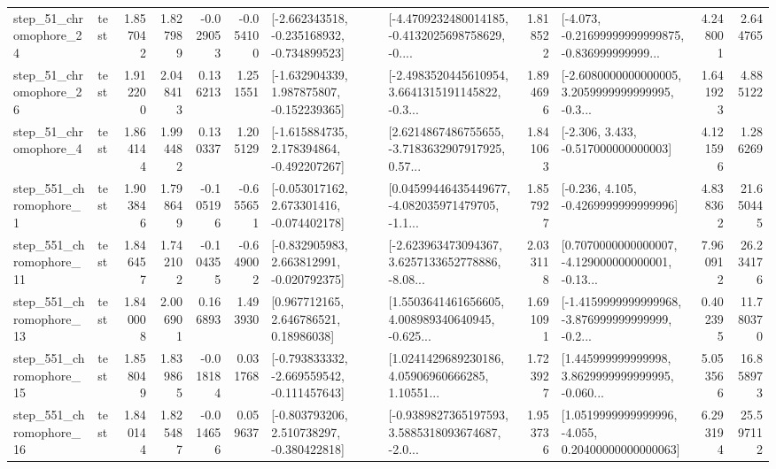 \begin{tabular}{llrrrrllrlrr}
   step\_51\_chromophore\_24 &      test &      1.857042 &    1.827989 &     -0.029053 & -0.054100 &  [-2.662343518, -0.235168932, -0.734899523] &  [-4.4709232480014185, -0.4132025698758629, -0.... &       1.818522 &  [-4.073, -0.21699999999999875, -0.836999999999... &            4.248001 &          2.644765 \\
   step\_51\_chromophore\_26 &      test &      1.912200 &    2.048413 &      0.136213 &  1.251551 &   [-1.632904339, 1.987875807, -0.152239365] &  [-2.4983520445610954, 3.6641315191145822, -0.3... &       1.894696 &  [-2.6080000000000005, 3.2059999999999995, -0.3... &            1.641923 &          4.885122 \\
    step\_51\_chromophore\_4 &      test &      1.864144 &    1.994482 &      0.130337 &  1.205129 &   [-1.615884735, 2.178394864, -0.492207267] &  [2.6214867486755655, -3.7183632907917925, 0.57... &       1.841063 &                [-2.306, 3.433, -0.517000000000003] &            4.121596 &          1.286269 \\
   step\_551\_chromophore\_1 &      test &      1.903846 &    1.798649 &     -0.105196 & -0.655651 &   [-0.053017162, 2.673301416, -0.074402178] &  [0.04599446435449677, -4.082035971479705, -1.1... &       1.857927 &               [-0.236, 4.105, -0.4269999999999996] &            4.838362 &         21.650445 \\
  step\_551\_chromophore\_11 &      test &      1.846457 &    1.742102 &     -0.104355 & -0.649002 &   [-0.832905983, 2.663812991, -0.020792375] &  [-2.623963473094367, 3.6257133652778886, -8.08... &       2.033118 &  [0.7070000000000007, -4.129000000000001, -0.13... &            7.960912 &         26.234176 \\
  step\_551\_chromophore\_13 &      test &      1.840008 &    2.006901 &      0.166893 &  1.493930 &      [0.967712165, 2.646786521, 0.18986038] &  [1.5503641461656605, 4.008989340640945, -0.625... &       1.691091 &  [-1.4159999999999968, -3.876999999999999, -0.2... &            0.402395 &         11.780370 \\
  step\_551\_chromophore\_15 &      test &      1.858049 &    1.839865 &     -0.018184 &  0.031768 &  [-0.793833332, -2.669559542, -0.111457643] &  [1.0241429689230186, 4.05906960666285, 1.10551... &       1.723927 &  [1.445999999999998, 3.8629999999999995, -0.060... &            5.053566 &         16.858973 \\
  step\_551\_chromophore\_16 &      test &      1.840144 &    1.825487 &     -0.014656 &  0.059637 &   [-0.803793206, 2.510738297, -0.380422818] &  [-0.9389827365197593, 3.5885318093674687, -2.0... &       1.953736 &  [1.0519999999999996, -4.055, 0.20400000000000063] &            6.293194 &         25.597112 \\

\end{tabular}
